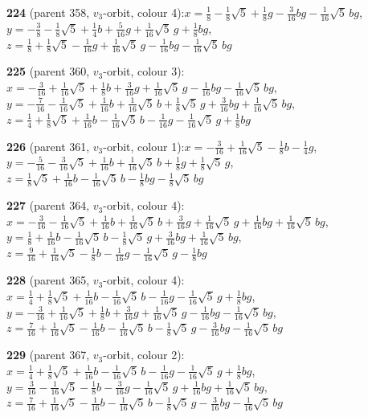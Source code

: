\documentclass[10pt]{article}
\begin{document}
{\noindent\textbf{224} (parent 358, $v_3$-orbit, colour 4):\quad $x=\tfrac{1}{8}-\tfrac{1}{8}\sqrt5+\tfrac{1}{8}g-\tfrac{3}{16}bg-\tfrac{1}{16}\sqrt5\,bg$,\quad $y=-\tfrac{3}{8}-\tfrac{1}{8}\sqrt5+\tfrac{1}{4}b+\tfrac{5}{16}g+\tfrac{1}{16}\sqrt5\,g+\tfrac{1}{8}bg$,\quad $z=\tfrac{1}{8}+\tfrac{1}{8}\sqrt5-\tfrac{1}{16}g+\tfrac{1}{16}\sqrt5\,g-\tfrac{1}{16}bg-\tfrac{1}{16}\sqrt5\,bg$\par\smallskip
\noindent\textbf{225} (parent 360, $v_3$-orbit, colour 3):\quad $x=-\tfrac{3}{16}+\tfrac{1}{16}\sqrt5+\tfrac{1}{8}b+\tfrac{3}{16}g+\tfrac{1}{16}\sqrt5\,g-\tfrac{1}{16}bg-\tfrac{1}{16}\sqrt5\,bg$,\quad $y=-\tfrac{7}{16}-\tfrac{1}{16}\sqrt5+\tfrac{1}{16}b+\tfrac{1}{16}\sqrt5\,b+\tfrac{1}{8}\sqrt5\,g+\tfrac{3}{16}bg+\tfrac{1}{16}\sqrt5\,bg$,\quad $z=\tfrac{1}{4}+\tfrac{1}{8}\sqrt5+\tfrac{1}{16}b-\tfrac{1}{16}\sqrt5\,b-\tfrac{1}{16}g-\tfrac{1}{16}\sqrt5\,g+\tfrac{1}{8}bg$\par\smallskip
\noindent\textbf{226} (parent 361, $v_3$-orbit, colour 1):\quad $x=-\tfrac{3}{16}+\tfrac{1}{16}\sqrt5-\tfrac{1}{8}b-\tfrac{1}{4}g$,\quad $y=-\tfrac{5}{16}-\tfrac{3}{16}\sqrt5+\tfrac{1}{16}b+\tfrac{1}{16}\sqrt5\,b+\tfrac{1}{8}g+\tfrac{1}{8}\sqrt5\,g$,\quad $z=\tfrac{1}{8}\sqrt5+\tfrac{1}{16}b-\tfrac{1}{16}\sqrt5\,b-\tfrac{1}{8}bg-\tfrac{1}{8}\sqrt5\,bg$\par\smallskip
\noindent\textbf{227} (parent 364, $v_3$-orbit, colour 4):\quad $x=-\tfrac{3}{16}-\tfrac{1}{16}\sqrt5+\tfrac{1}{16}b+\tfrac{1}{16}\sqrt5\,b+\tfrac{3}{16}g+\tfrac{1}{16}\sqrt5\,g+\tfrac{1}{16}bg+\tfrac{1}{16}\sqrt5\,bg$,\quad $y=\tfrac{1}{8}+\tfrac{1}{16}b-\tfrac{1}{16}\sqrt5\,b-\tfrac{1}{8}\sqrt5\,g+\tfrac{3}{16}bg+\tfrac{1}{16}\sqrt5\,bg$,\quad $z=\tfrac{9}{16}+\tfrac{1}{16}\sqrt5-\tfrac{1}{8}b-\tfrac{1}{16}g-\tfrac{1}{16}\sqrt5\,g-\tfrac{1}{8}bg$\par\smallskip
\noindent\textbf{228} (parent 365, $v_3$-orbit, colour 4):\quad $x=\tfrac{1}{4}+\tfrac{1}{8}\sqrt5+\tfrac{1}{16}b-\tfrac{1}{16}\sqrt5\,b-\tfrac{1}{16}g-\tfrac{1}{16}\sqrt5\,g+\tfrac{1}{8}bg$,\quad $y=-\tfrac{3}{16}+\tfrac{1}{16}\sqrt5+\tfrac{1}{8}b+\tfrac{3}{16}g+\tfrac{1}{16}\sqrt5\,g-\tfrac{1}{16}bg-\tfrac{1}{16}\sqrt5\,bg$,\quad $z=\tfrac{7}{16}+\tfrac{1}{16}\sqrt5-\tfrac{1}{16}b-\tfrac{1}{16}\sqrt5\,b-\tfrac{1}{8}\sqrt5\,g-\tfrac{3}{16}bg-\tfrac{1}{16}\sqrt5\,bg$\par\smallskip
\noindent\textbf{229} (parent 367, $v_3$-orbit, colour 2):\quad $x=\tfrac{1}{4}+\tfrac{1}{8}\sqrt5+\tfrac{1}{16}b-\tfrac{1}{16}\sqrt5\,b-\tfrac{1}{16}g-\tfrac{1}{16}\sqrt5\,g+\tfrac{1}{8}bg$,\quad $y=\tfrac{3}{16}-\tfrac{1}{16}\sqrt5-\tfrac{1}{8}b-\tfrac{3}{16}g-\tfrac{1}{16}\sqrt5\,g+\tfrac{1}{16}bg+\tfrac{1}{16}\sqrt5\,bg$,\quad $z=\tfrac{7}{16}+\tfrac{1}{16}\sqrt5-\tfrac{1}{16}b-\tfrac{1}{16}\sqrt5\,b-\tfrac{1}{8}\sqrt5\,g-\tfrac{3}{16}bg-\tfrac{1}{16}\sqrt5\,bg$\par\smallskip
}
\end{document}
